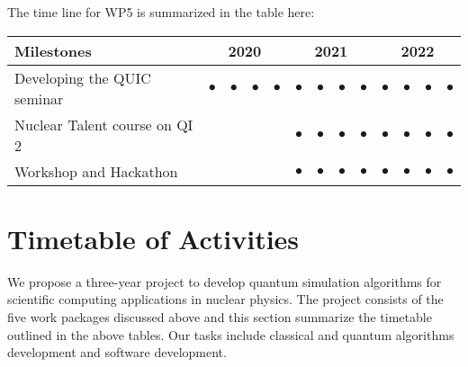 \documentclass[10pt]{article}
\begin{document}
The time line for WP5 is summarized in the table here:
\begin{footnotesize}
\begin{center}
\begin{tabular}{|l|c|c|c|c|c|c|c|c|c|c|c|c|}
\hline
\multicolumn{1}{|l}{Milestones } & \multicolumn{4}{|c|}{ 2020 } & \multicolumn{4}{c|}{ 2021 } & \multicolumn{4}{c|}{ 2022 } \\
\hline
Developing the QUIC seminar &$\bullet$ &$\bullet$ &$\bullet$ &$\bullet$ &$\bullet$ &$\bullet$ &$\bullet$ &$\bullet$ &$\bullet$ &$\bullet$ &$\bullet$ &$\bullet$  \\
\hline
Nuclear Talent course on QI 2 & & & & &$\bullet$ &$\bullet$ &$\bullet$ &$\bullet$ &$\bullet$ &$\bullet$ &$\bullet$ &$\bullet$  \\
\hline
Workshop and Hackathon & & & & &$\bullet$ &$\bullet$ &$\bullet$ &$\bullet$ &$\bullet$ &$\bullet$ &$\bullet$ &$\bullet$  \\
\hline


\end{tabular}
\end{center}
\end{footnotesize}


\section{Timetable of Activities}
We propose a three-year project to develop quantum simulation algorithms for scientific computing applications in nuclear physics. The project consists of the five work packages discussed above and this section summarize the timetable outlined in the above tables. Our tasks include classical and quantum algorithms
development and software development.
\end{document}

